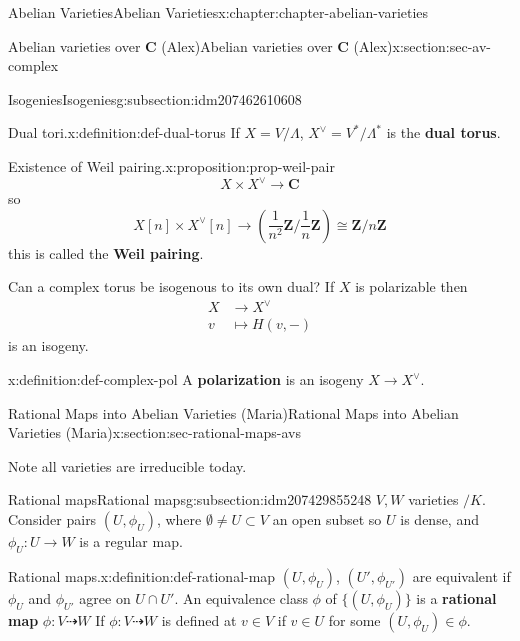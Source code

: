 \documentclass[oneside,10pt,]{book}
\newcommand{\terminology}[1]{\textbf{#1}}
\numberwithin{equation}{section}
\newcommand{\ZZ}{\mathbf{Z}}
\newcommand{\CC}{\mathbf{C}}
\newcommand{\amp}{&}
\begin{document}
\begin{chapterptx}{Abelian Varieties}{}{Abelian Varieties}{}{}{x:chapter:chapter-abelian-varieties}
\begin{sectionptx}{Abelian varieties over \(\CC\) (Alex)}{}{Abelian varieties over \(\CC\) (Alex)}{}{}{x:section:sec-av-complex}
\begin{subsectionptx}{Isogenies}{}{Isogenies}{}{}{g:subsection:idm207462610608}
\begin{definition}{Dual tori.}{x:definition:def-dual-torus}%
If \(X = V/\Lambda\), \(X^\vee = V^*/ \Lambda^*\) is the \terminology{dual torus}.%
\end{definition}
\begin{proposition}{Existence of Weil pairing.}{}{x:proposition:prop-weil-pair}%
%
\begin{equation*}
X\times X^\vee \to \CC
\end{equation*}
so%
\begin{equation*}
X[n] \times X^\vee[n] \to \left(\frac{1}{n^2} \ZZ/\frac{1}{n} \ZZ\right) \cong \ZZ/n\ZZ
\end{equation*}
this is called the \terminology{Weil pairing}.%
\end{proposition}
Can a complex torus be isogenous to its own dual? If \(X\) is polarizable then%
\begin{align*}
X \amp\to X^\vee\\
v\amp\mapsto H(v,-)
\end{align*}
is an isogeny.%
\begin{definition}{}{x:definition:def-complex-pol}%
A \terminology{polarization} is an isogeny \(X \to X^\vee\).%
\end{definition}
\end{subsectionptx}
\end{sectionptx}
%
%
\typeout{************************************************}
\typeout{************************************************}
%
\begin{sectionptx}{Rational Maps into Abelian Varieties (Maria)}{}{Rational Maps into Abelian Varieties (Maria)}{}{}{x:section:sec-rational-maps-avs}
\begin{introduction}{}%
Note all varieties are irreducible today.%
\end{introduction}%
%
%
\typeout{************************************************}
\typeout{************************************************}
%
\begin{subsectionptx}{Rational maps}{}{Rational maps}{}{}{g:subsection:idm207429855248}
\(V,W\) varieties \(/K\). Consider pairs \((U,\phi_U)\), where \(\emptyset \ne  U \subset V\) an open subset so \(U\) is dense, and \(\phi_U \colon U \to W\) is a regular map.%
\begin{definition}{Rational maps.}{x:definition:def-rational-map}%
\((U,\phi_U)\), \((U',{\phi_{U'}})\) are equivalent if \(\phi_U\) and \(\phi_{U'}\) agree on \(U \cap U'\). An equivalence class \(\phi\) of \(\{(U, \phi_U)\}\) is a \terminology{rational map} \(\phi \colon V \dashrightarrow W\) If \(\phi\colon V \dashrightarrow W\) is defined at   \(v\in V\) if \(v\in U\) for some \((U,\phi_U) \in \phi\).%

\end{definition}
\end{subsectionptx}
\end{sectionptx}
\end{chapterptx}
\end{document}
